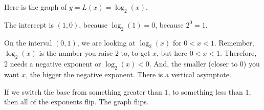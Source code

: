 \documentclass{ximera}
\begin{document}
\begin{example}

Here is the graph of $y = L(x) = \log_2(x)$.

\begin{image}
\end{image}


The intercept is $(1,0)$, because $\log_2(1) = 0$, because $2^0 = 1$.

On the interval $(0,1)$, we are looking at $\log_2(x)$ for $0<x<1$.  Remember, $\log_2(x)$ is the number you raise $2$ to, to get $x$, but here $0<x<1$.  Therefore, $2$ needs a negative exponent or $\log_2(x) < 0$.  And, the smaller (closer to $0$) you want $x$, the bigger the negative exponent.  There is a vertical asymptote. 





\end{example}



If we switch the base from something greater than $1$, to something less than $1$, then all of the exponents flip.  The graph flips.
\end{document}
